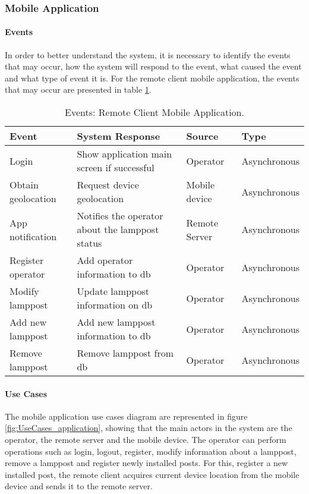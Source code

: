 \subsubsection*{Mobile Application}
\paragraph*{Events}
In order to better understand the system, it is necessary to identify the events that may occur, how the system will respond to the event, what caused the event and what type of event it is. For the remote client mobile application, the events that may occur are presented in table \ref{table:rc_app_events}.

\begin{table}[ht]
	\centering
	\resizebox{\columnwidth}{!}
	{
		\begin{tabular}{|m{3cm}|m{5cm}|m{2.4cm}|m{2.4cm}|}
			\hline
			\textbf{Event} & \textbf{System Response} & \textbf{Source} & \textbf{Type}\\
			\hline\hline
			Login & Show application main screen if successful & Operator & Asynchronous\\
			\hline
			
			Obtain geolocation & Request device geolocation & Mobile device & Asynchronous\\
			\hline
			
			App notification & Notifies the operator about the lamppost status & Remote Server & Asynchronous\\
			\hline
			
			Register operator & Add operator information to \ac{db} & Operator & Asynchronous\\
			\hline
			
			Modify lamppost & Update lamppost information on \ac{db} & Operator & Asynchronous\\
			\hline
			
			Add new lamppost & Add new lamppost information to \ac{db} & Operator & Asynchronous\\
			\hline			
			
			Remove lamppost & Remove lamppost  from \ac{db} & Operator & Asynchronous\\
			\hline			
		\end{tabular}
	}
	\caption{Events: Remote Client Mobile Application.}
	\label{table:rc_app_events}
\end{table}

\paragraph*{Use Cases}
The mobile application use cases diagram are represented in figure \ref{fig:UseCases_application}, showing that the main actors in the system are the operator, the remote server and the mobile device. The operator can perform operations such as login, logout, register, modify information about a lamppost, remove a lamppost and register newly installed posts. For this, register a new installed post, the remote client acquires current device location from the mobile device and sends it to the remote server.

